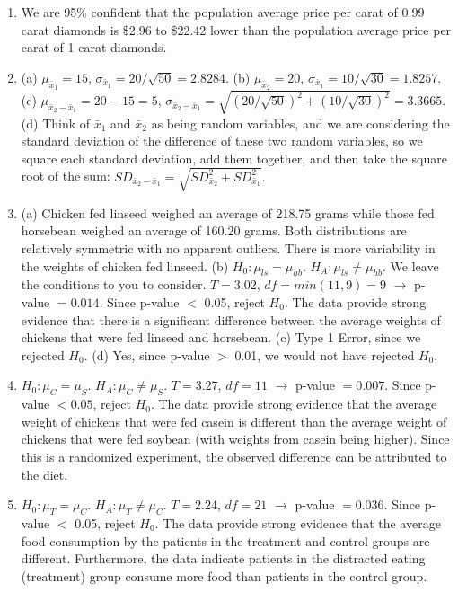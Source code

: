\documentclass[
  10pt,
  openany]{book}
\begin{document}
\begin{enumerate}
  \addtocounter{enumi}{1}
\item
  We are 95\% confident that the population average price per carat of 0.99 carat diamonds is \$2.96 to \$22.42 lower than the population average price per carat of 1 carat diamonds.

  \addtocounter{enumi}{1}
\item
  (a) \(\mu_{\bar{x}_1} = 15\), \(\sigma_{\bar{x}_1} = 20 / \sqrt{50} = 2.8284.\) (b) \(\mu_{\bar{x}_2} = 20\), \(\sigma_{\bar{x}_1} = 10 / \sqrt{30} = 1.8257.\) (c) \(\mu_{\bar{x}_2 - \bar{x}_1} = 20 - 15 = 5\), \(\sigma_{\bar{x}_2 - \bar{x}_1} = \sqrt{\left(20 / \sqrt{50}\right)^2 + \left(10 / \sqrt{30}\right)^2} = 3.3665.\) (d) Think of \(\bar{x}_1\) and \(\bar{x}_2\) as being random variables, and we are considering the standard deviation of the difference of these two random variables, so we square each standard deviation, add them together, and then take the square root of the sum: \(SD_{\bar{x}_2 - \bar{x}_1} = \sqrt{SD_{\bar{x}_2}^2 + SD_{\bar{x}_1}^2}.\)

  \addtocounter{enumi}{1}
\item
  (a) Chicken fed linseed weighed an average of 218.75 grams while those fed horsebean weighed an average of 160.20 grams. Both distributions are relatively symmetric with no apparent outliers. There is more variability in the weights of chicken fed linseed. (b) \(H_0: \mu_{ls} = \mu_{hb}\). \(H_A: \mu_{ls} \ne \mu_{hb}\). We leave the conditions to you to consider. \(T=3.02\), \(df = min(11, 9) = 9\) \(\to\) p-value \(= 0.014\). Since p-value \(<\) 0.05, reject \(H_0\). The data provide strong evidence that there is a significant difference between the average weights of chickens that were fed linseed and horsebean. (c) Type 1 Error, since we rejected \(H_0\). (d) Yes, since p-value \(>\) 0.01, we would not have rejected \(H_0\).

  \addtocounter{enumi}{1}
\item
  \(H_0: \mu_C = \mu_S\). \(H_A: \mu_C \ne \mu_S\). \(T = 3.27\), \(df=11\) \(\to\) p-value \(= 0.007\). Since p-value \(< 0.05\), reject \(H_0\). The data provide strong evidence that the average weight of chickens that were fed casein is different than the average weight of chickens that were fed soybean (with weights from casein being higher). Since this is a randomized experiment, the observed difference can be attributed to the diet.

  \addtocounter{enumi}{1}
\item
  \(H_0: \mu_{T} = \mu_{C}\). \(H_A: \mu_{T} \ne \mu_{C}\). \(T=2.24\), \(df=21\) \(\to\) p-value \(= 0.036\). Since p-value \(<\) 0.05, reject \(H_0\). The data provide strong evidence that the average food consumption by the patients in the treatment and control groups are different. Furthermore, the data indicate patients in the distracted eating (treatment) group consume more food than patients in the control group.

  \addtocounter{enumi}{1}
\end{enumerate}
\end{document}
